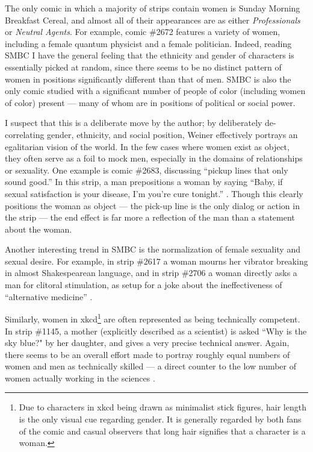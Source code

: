 \documentclass[man,12pt]{apa6}
\begin{document}
The only comic in which a majority of strips contain women is Sunday Morning Breakfast Cereal, and almost all of their appearances are as either \emph{Professionals} or \emph{Neutral Agents}. For example, comic \#2672 \cite{smbc} features a variety of women, including a female quantum physicist and a female politician. Indeed, reading SMBC I have the general feeling that the ethnicity and gender of characters is essentially picked at random, since there seems to be no distinct pattern of women in positions significantly different than that of men. SMBC is also the only comic studied with a significant number of people of color (including women of color) present --- many of whom are in positions of political or social power. 

I suspect that this is a deliberate move by the author; by deliberately de-correlating gender, ethnicity, and social position, Weiner effectively portrays an egalitarian vision of the world. In the few cases where women exist as object, they often serve as a foil to mock men, especially in the domains of relationships or sexuality. One example is comic \#2683, discussing ``pickup lines that only sound good.'' In this strip, a man prepositions a woman by saying ``Baby, if sexual satisfaction is your disease, I'm you're cure tonight.'' \cite{smbc}. Though this clearly positions the woman as object --- the pick-up line is the only dialog or action in the strip --- the end effect is far more a reflection of the man than a statement about the woman. 

Another interesting trend in SMBC is the normalization of female sexuality and sexual desire. For example, in strip \#2617 a woman mourns her vibrator breaking in almost Shakespearean language, and in strip \#2706 a woman directly asks a man for clitoral stimulation, as setup for a joke about the ineffectiveness of ``alternative medicine'' \cite{smbc}.

Similarly, women in xkcd\footnote{Due to characters in xkcd being drawn as minimalist stick figures, hair length is the only visual cue regarding gender. It is generally regarded by both fans of the comic and casual observers that long hair signifies that a character is a woman.} are often represented as being technically competent. In strip \#1145, a mother (explicitly described as a scientist) is asked ``Why is the sky blue?" by her daughter, and gives a very precise technical answer. Again, there seems to be an overall effort made to portray roughly equal numbers of women and men as technically skilled --- a direct counter to the low number of women actually working in the sciences \cite{varma2007women}. 
\end{document}
